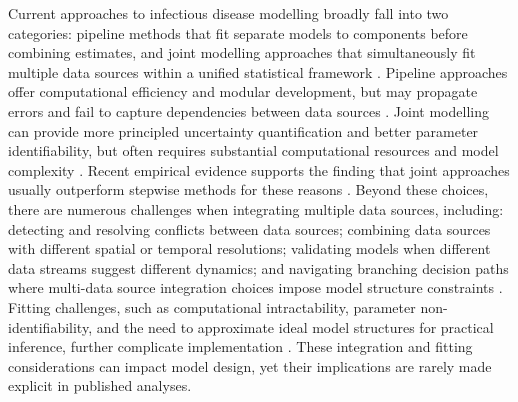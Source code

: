 \documentclass{article}
\begin{document}
Current approaches to infectious disease modelling broadly fall into two categories: pipeline methods that fit separate models to components before combining estimates, and joint modelling approaches that simultaneously fit multiple data sources within a unified statistical framework \citep{deangelis2018analysing, russell2024combined}.
Pipeline approaches offer computational efficiency and modular development, but may propagate errors and fail to capture dependencies between data sources \citep{lison2024generative, Ward2024-sp}.
Joint modelling can provide more principled uncertainty quantification and better parameter identifiability, but often requires substantial computational resources and model complexity \citep{russell2024combined, lison2024generative}.
Recent empirical evidence supports the finding that joint approaches usually outperform stepwise methods for these reasons \citep{lison2024generative}.
Beyond these choices, there are numerous challenges when integrating multiple data sources, including: detecting and resolving conflicts between data sources; combining data sources with different spatial or temporal resolutions; validating models when different data streams suggest different dynamics; and navigating branching decision paths where multi-data source integration choices impose model structure constraints \citep{deangelis2018analysing, nicholson2022interoperability}.
Fitting challenges, such as computational intractability, parameter non-identifiability, and the need to approximate ideal model structures for practical inference, further complicate implementation \citep{corbella2022inferring, Ward2024-sp}.
These integration and fitting considerations can impact model design, yet their implications are rarely made explicit in published analyses.
\end{document}
